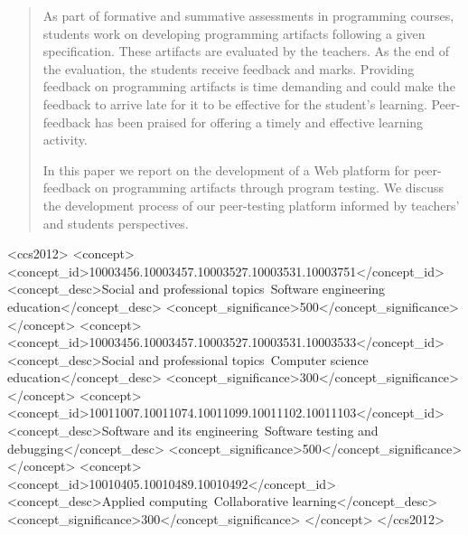 \documentclass[sigplan,10pt,review]{acmart}\settopmatter{printfolios=true}
\begin{document}


\begin{abstract}
  As part of formative and summative assessments in programming
  courses, students work on developing programming artifacts following
  a given specification. These artifacts are evaluated by the
  teachers. As the end of the evaluation, the students receive
  feedback and marks. Providing feedback on programming artifacts is
  time demanding and could make the feedback to arrive late for it to
  be effective for the student's learning. Peer-feedback has been
  praised for offering a timely and effective learning activity.

  In this paper we report on the development of a Web platform for
  peer-feedback on programming artifacts through program testing. We
  discuss the development process of our peer-testing platform
  informed by teachers' and students perspectives.
\end{abstract}

\begin{CCSXML}
<ccs2012>
<concept>
<concept_id>10003456.10003457.10003527.10003531.10003751</concept_id>
<concept_desc>Social and professional topics~Software engineering education</concept_desc>
<concept_significance>500</concept_significance>
</concept>
<concept>
<concept_id>10003456.10003457.10003527.10003531.10003533</concept_id>
<concept_desc>Social and professional topics~Computer science education</concept_desc>
<concept_significance>300</concept_significance>
</concept>
<concept>
<concept_id>10011007.10011074.10011099.10011102.10011103</concept_id>
<concept_desc>Software and its engineering~Software testing and debugging</concept_desc>
<concept_significance>500</concept_significance>
</concept>
<concept>
<concept_id>10010405.10010489.10010492</concept_id>
<concept_desc>Applied computing~Collaborative learning</concept_desc>
<concept_significance>300</concept_significance>
</concept>
</ccs2012>
\end{CCSXML}
\end{document}
